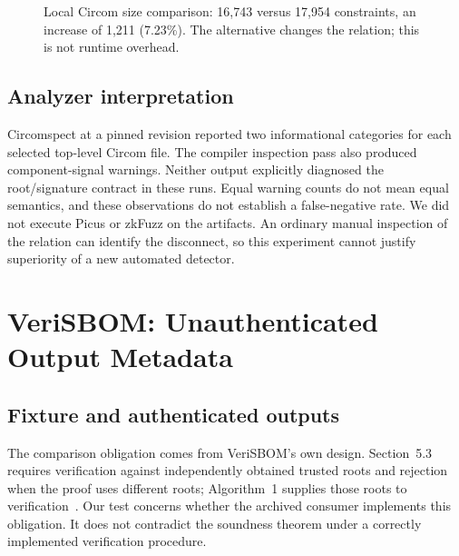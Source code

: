 \documentclass[sigconf,nonacm]{acmart}
\begin{document}
\begin{figure}[t]
\centering
{}
\caption{Local Circom size comparison: 16,743 versus 17,954 constraints, an increase of 1,211 (7.23\%). The alternative changes the relation; this is not runtime overhead.}
\label{fig:size}
\end{figure}

\subsection{Analyzer interpretation}
Circomspect at a pinned revision reported two informational categories for each selected top-level Circom file. The compiler inspection pass also produced component-signal warnings. Neither output explicitly diagnosed the root/signature contract in these runs. Equal warning counts do not mean equal semantics, and these observations do not establish a false-negative rate. We did not execute Picus or zkFuzz on the artifacts. An ordinary manual inspection of the relation can identify the disconnect, so this experiment cannot justify superiority of a new automated detector.

\section{VeriSBOM: Unauthenticated Output Metadata}
\subsection{Fixture and authenticated outputs}
The comparison obligation comes from VeriSBOM's own design. Section~5.3 requires verification against independently obtained trusted roots and rejection when the proof uses different roots; Algorithm~1 supplies those roots to verification~\cite{verisbom}. Our test concerns whether the archived consumer implements this obligation. It does not contradict the soundness theorem under a correctly implemented verification procedure.
\end{document}
